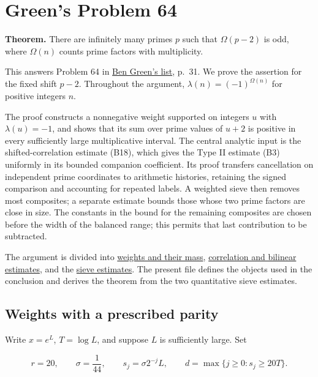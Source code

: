 \hypertarget{proof}{%
\section{Green's Problem 64}\label{proof}}

\textbf{Theorem.} There are infinitely many primes \(p\) such that
\(\Omega(p-2)\) is odd, where \(\Omega(n)\) counts prime factors with
multiplicity.

This answers Problem 64 in
\href{https://people.maths.ox.ac.uk/greenbj/papers/open-problems.pdf}{Ben
Green's list}, p.~31. We prove the assertion for the fixed shift
\(p-2\). Throughout the argument, \(\lambda(n)=(-1)^{\Omega(n)}\) for
positive integers \(n\).

The proof constructs a nonnegative weight supported on integers \(u\)
with \(\lambda(u)=-1\), and shows that its sum over prime values of
\(u+2\) is positive in every sufficiently large multiplicative interval.
The central analytic input is the shifted-correlation estimate (B18),
which gives the Type II estimate (B3) uniformly in its bounded companion
coefficient. Its proof transfers cancellation on independent prime
coordinates to arithmetic histories, retaining the signed comparison and
accounting for repeated labels. A weighted sieve then removes most
composites; a separate estimate bounds those whose two prime factors are
close in size. The constants in the bound for the remaining composites
are chosen before the width of the balanced range; this permits that
last contribution to be subtracted.

The argument is divided into \protect\hyperlink{weights}{weights and
their mass}, \protect\hyperlink{correlation}{correlation and bilinear
estimates}, and the \protect\hyperlink{sieve}{sieve estimates}. The
present file defines the objects used in the conclusion and derives the
theorem from the two quantitative sieve estimates.


\hypertarget{proof-weights-with-a-prescribed-parity}{%
\subsection{Weights with a prescribed
parity}\label{proof-weights-with-a-prescribed-parity}}

Write \(x=e^L\), \(T=\log L\), and suppose \(L\) is sufficiently large.
Set

\[
r=20,\qquad \sigma=\frac1{44},\qquad s_j=\sigma 2^{-j}L,
\qquad d=\max\{j\ge0:s_j\ge20T\}.
\]

